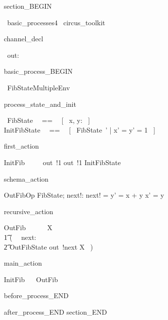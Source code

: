 section_BEGIN
\begin{zsection}
  \SECTION\ basic\_processes4 \parents\ circus\_toolkit
\end{zsection}
channel_decl
\begin{circus}
    \circchannel\ out: \nat
\end{circus}
basic_process_BEGIN
\begin{circus}
    \circprocess\ FibStateMultipleEnv ~~\circdef~~ \circbegin
\end{circus}
process_state_and_init
\begin{circusaction}
    \circstate\ FibState ~~==~~ [~ x, y: \nat ~]  \land [ z: \nat ]\\
    InitFibState ~~==~~ [~ FibState~' | x' = y' = 1 ~]
\end{circusaction}
first_action
\begin{circusaction}
    InitFib ~~\circdef~~ out~!1 \then out~!1 \then InitFibState
\end{circusaction}
schema_action
\begin{schema}{OutFibOp}
    \Delta FibState; next!: \nat
\where
    next! = y' = x + y \land x' = y
\end{schema}
recursive_action
\begin{circusaction}
    OutFib ~~\circdef~~ \circmu\ X \circspot \\
    	\t1 (~ \circvar\ next: \nat \circspot \\
	   \t2 OutFibState \circseq out~!next \then X ~)
\end{circusaction}
main_action
\begin{circusaction}
    \circspot InitFib ~\circseq~ OutFib
\end{circusaction}
before_process_END
\begin{circus}
    \circend
\end{circus}
after_process_END
section_END 